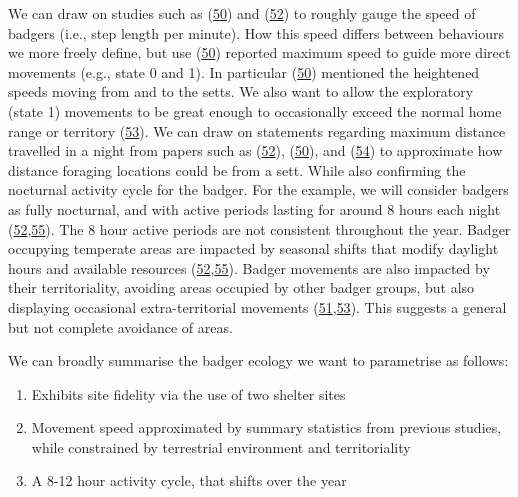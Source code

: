 \documentclass[10pt,a4paper]{article}
\begin{document}
We can draw on studies such as (\protect\hyperlink{ref-kowalczyk_daily_2006}{50}) and (\protect\hyperlink{ref-rosalino_activity_2005}{52}) to roughly gauge the speed of badgers (i.e., step length per minute).
How this speed differs between behaviours we more freely define, but use (\protect\hyperlink{ref-kowalczyk_daily_2006}{50}) reported maximum speed to guide more direct movements (e.g., state 0 and 1).
In particular (\protect\hyperlink{ref-kowalczyk_daily_2006}{50}) mentioned the heightened speeds moving from and to the setts.
We also want to allow the exploratory (state 1) movements to be great enough to occasionally exceed the normal home range or territory (\protect\hyperlink{ref-kelly_extra_2020}{53}).
We can draw on statements regarding maximum distance travelled in a night from papers such as (\protect\hyperlink{ref-rosalino_activity_2005}{52}), (\protect\hyperlink{ref-kowalczyk_daily_2006}{50}), and (\protect\hyperlink{ref-loureiro_path_2007}{54}) to approximate how distance foraging locations could be from a sett.
While also confirming the nocturnal activity cycle for the badger.
For the example, we will consider badgers as fully nocturnal, and with active periods lasting for around 8 hours each night (\protect\hyperlink{ref-rosalino_activity_2005}{52},\protect\hyperlink{ref-magowan_dead-reckoning_2022}{55}).
The 8 hour active periods are not consistent throughout the year.
Badger occupying temperate areas are impacted by seasonal shifts that modify daylight hours and available resources (\protect\hyperlink{ref-rosalino_activity_2005}{52},\protect\hyperlink{ref-magowan_dead-reckoning_2022}{55}).
Badger movements are also impacted by their territoriality, avoiding areas occupied by other badger groups, but also displaying occasional extra-territorial movements (\protect\hyperlink{ref-feore_habitat_1999}{51},\protect\hyperlink{ref-kelly_extra_2020}{53}).
This suggests a general but not complete avoidance of areas.

We can broadly summarise the badger ecology we want to parametrise as follows:

\begin{enumerate}
\def\labelenumi{\arabic{enumi}.}
\item
  Exhibits site fidelity via the use of two shelter sites
\item
  Movement speed approximated by summary statistics from previous studies, while constrained by terrestrial environment and territoriality
\item
  A 8-12 hour activity cycle, that shifts over the year
\end{enumerate}
\end{document}
